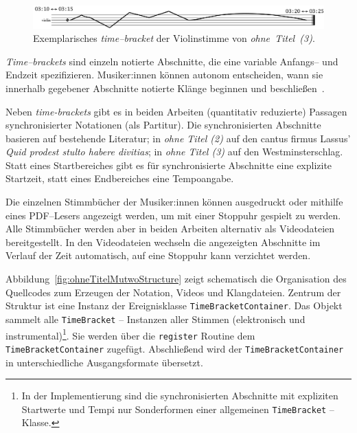 \documentclass[12pt,a4paper,ngerman]{article}
\begin{document}
\bigskip

\begin{figure}[h!]
    \begin{center}
        \includegraphics[scale=0.25]{pictures/time-bracket-ohne-titel-3-2.png}
    \end{center}
    \caption{%
        Exemplarisches \emph{time--bracket} der Violinstimme von \emph{ohne~Titel~(3)}.
    }
\end{figure}


\emph{Time--brackets} sind einzeln notierte Abschnitte, die eine variable Anfangs-- und Endzeit spezifizieren.
Musiker:innen können autonom entscheiden, wann sie innerhalb gegebener Abschnitte notierte Klänge beginnen und beschließen~\parencite[S. 179f]{cageTimeBrackets}.

\bigskip

Neben \emph{time-brackets} gibt es in beiden Arbeiten (quantitativ reduzierte) Passagen synchronisierter Notationen (als Partitur).
Die synchronisierten Abschnitte basieren auf bestehende Literatur; in \emph{ohne Titel (2)} auf den cantus firmus Lassus' \emph{Quid prodest stulto habere divitias}; in \emph{ohne Titel (3)} auf den Westminsterschlag.
Statt eines Startbereiches gibt es für synchronisierte Abschnitte eine explizite Startzeit, statt eines Endbereiches eine Tempoangabe.

\bigskip

Die einzelnen Stimmbücher der Musiker:innen können ausgedruckt oder mithilfe eines PDF--Lesers angezeigt werden, um mit einer Stoppuhr gespielt zu werden.
Alle Stimmbücher werden aber in beiden Arbeiten alternativ als Videodateien bereitgestellt.
In den Videodateien wechseln die angezeigten Abschnitte im Verlauf der Zeit automatisch, auf eine Stoppuhr kann verzichtet werden.

\bigskip

Abbildung~\ref{fig:ohneTitelMutwoStructure} zeigt schematisch die Organisation des Quellcodes zum Erzeugen der Notation, Videos und Klangdateien.
Zentrum der Struktur ist eine Instanz der Ereignisklasse \texttt{TimeBracketContainer}.
Das Objekt sammelt alle \texttt{TimeBracket} -- Instanzen aller Stimmen (elektronisch und instrumental)\footnote{%
    In der Implementierung sind die synchronisierten Abschnitte mit expliziten Startwerte und Tempi nur Sonderformen einer allgemeinen \texttt{TimeBracket} -- Klasse.
}.
Sie werden über die \texttt{register} Routine dem \texttt{TimeBracketContainer} zugefügt.
Abschließend wird der \texttt{TimeBracketContainer} in unterschiedliche Ausgangsformate übersetzt.
\end{document}
